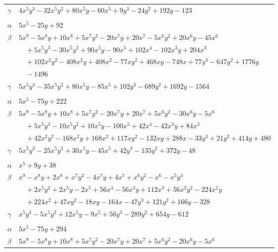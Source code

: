 \documentclass[11pt]{article}
\begin{document}
\begin{longtable}{@{}ll@{}}
$\gamma$ & $4x^{5}y^{3}-32x^{5}y^{2}+80x^{5}y-60x^{5}+9y^{3}-24y^{2}+192y-123$\\
\addlinespace[3pt]
\multicolumn{2}{@{}l}{$\{i,j\}=\{15,27\}$, $k_{ij}=2^{3}\cdot 3^{2}\cdot 7$}\\
$\alpha$ & $5x^{5}-25y+92$\\
$\beta$ & $5x^{9}-5x^{8}y+10x^{8}+5x^{7}y^{2}-20x^{7}y+20x^{7}-5x^{6}y^{2}+20x^{6}y-45x^{6}$\\
 & $\quad +5x^{5}y^{3}-30x^{5}y^{2}+90x^{5}y-90x^{5}+102x^{4}-102x^{3}y+204x^{3}$\\
 & $\quad +102x^{2}y^{2}-408x^{2}y+408x^{2}-77xy^{2}+468xy-748x+77y^{3}-647y^{2}+1776y$\\
 & $\quad -1496$\\
$\gamma$ & $5x^{5}y^{3}-35x^{5}y^{2}+80x^{5}y-85x^{5}+102y^{3}-689y^{2}+1692y-1564$\\
\addlinespace[3pt]
\multicolumn{2}{@{}l}{$\{i,j\}=\{15,31\}$, $k_{ij}=2^{3}\cdot 3\cdot 7\cdot 11$}\\
$\alpha$ & $5x^{5}-75y+222$\\
$\beta$ & $5x^{9}-5x^{8}y+10x^{8}+5x^{7}y^{2}-20x^{7}y+20x^{7}+5x^{6}y^{2}-30x^{6}y-5x^{6}$\\
 & $\quad +5x^{5}y^{3}-10x^{5}y^{2}+10x^{5}y-100x^{5}+42x^{4}-42x^{3}y+84x^{3}$\\
 & $\quad +42x^{2}y^{2}-168x^{2}y+168x^{2}+117xy^{2}-132xy+288x-33y^{3}+21y^{2}+414y+480$\\
$\gamma$ & $5x^{5}y^{3}-25x^{5}y^{2}+30x^{5}y-45x^{5}+42y^{3}-135y^{2}+372y-48$\\
\addlinespace[3pt]
\multicolumn{2}{@{}l}{$\{i,j\}=\{15,32\}$, $k_{ij}=2^{4}\cdot 3^{2}\cdot 5$}\\
$\alpha$ & $x^{5}+9y+38$\\
$\beta$ & $x^{9}-x^{8}y+2x^{8}+x^{7}y^{2}-4x^{7}y+4x^{7}+x^{6}y^{2}-x^{6}-x^{5}y^{3}$\\
 & $\quad +2x^{5}y^{2}+2x^{5}y-2x^{5}+56x^{4}-56x^{3}y+112x^{3}+56x^{2}y^{2}-224x^{2}y$\\
 & $\quad +224x^{2}+47xy^{2}-18xy-164x-47y^{3}+121y^{2}+166y-328$\\
$\gamma$ & $x^{5}y^{3}-5x^{5}y^{2}+12x^{5}y-9x^{5}+56y^{3}-289y^{2}+654y-612$\\
\addlinespace[3pt]
\multicolumn{2}{@{}l}{$\{i,j\}=\{15,33\}$, $k_{ij}=2^{6}\cdot 3^{3}$}\\
$\alpha$ & $5x^{5}-75y+294$\\
$\beta$ & $5x^{9}-5x^{8}y+10x^{8}+5x^{7}y^{2}-20x^{7}y+20x^{7}+5x^{6}y^{2}-20x^{6}y-5x^{6}$\\

\end{longtable}
\end{document}
